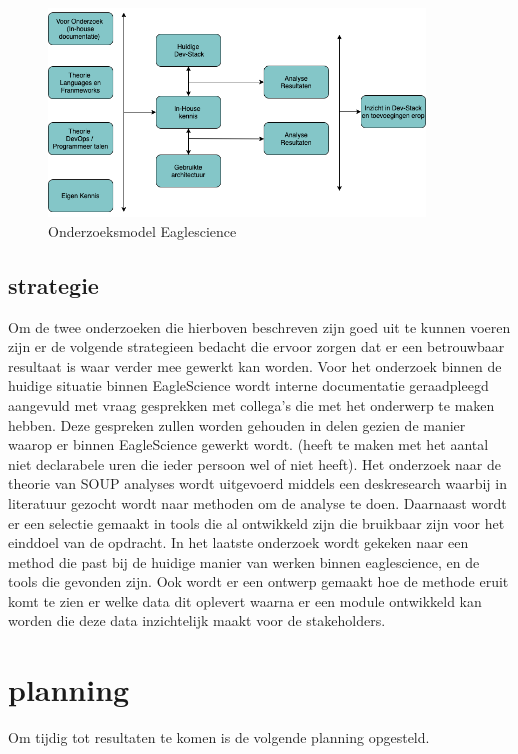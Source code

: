 \begin{figure}[htbp]
    \myfloatalign
    \includegraphics[width=10cm]{gfx/OnderzoeksmodelES}
    \caption{Onderzoeksmodel Eaglescience}
    \label{fig:OnderzoeksModelEaglescience}
\end{figure}

\subsection{strategie}\label{subsec:opstrategie}
Om de twee onderzoeken die hierboven beschreven zijn goed uit te kunnen voeren zijn er de volgende strategieen bedacht die ervoor zorgen dat er een betrouwbaar resultaat is waar verder mee gewerkt kan worden.
Voor het onderzoek binnen de huidige situatie binnen EagleScience wordt interne documentatie geraadpleegd aangevuld met vraag gesprekken met collega's die met het onderwerp te maken hebben. Deze gespreken zullen worden gehouden in delen gezien de manier waarop er binnen EagleScience gewerkt wordt. (heeft te maken met het aantal niet declarabele uren die ieder persoon wel of niet heeft). Het onderzoek naar de theorie van SOUP analyses wordt uitgevoerd middels een deskresearch waarbij in literatuur gezocht wordt naar methoden om de analyse te doen. Daarnaast wordt er een selectie gemaakt in tools die al ontwikkeld zijn die bruikbaar zijn voor het einddoel van de opdracht. In het laatste onderzoek wordt gekeken naar een method die past bij de huidige manier van werken binnen eaglescience, en de tools die gevonden zijn. Ook wordt er een ontwerp gemaakt hoe de methode eruit komt te zien er welke data dit oplevert waarna er een module ontwikkeld kan worden die deze data inzichtelijk maakt voor de stakeholders.


\section{planning}\label{sec:planning}
Om tijdig tot resultaten te komen is de volgende planning opgesteld.

